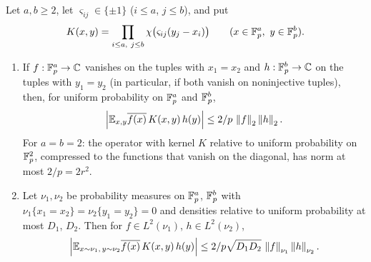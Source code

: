 \begin{corollary}\label{cor:dl:normalized}
Let $a,b\ge2$, let $\varsigma_{ij}\in\{\pm1\}$ ($i\le a$, $j\le b$), and put
\[
  K(x,y)=\prod_{i\le a,\ j\le b}\chi\big(\varsigma_{ij}(y_j-x_i)\big)
  \qquad(x\in\mathbb F_p^a,\ y\in\mathbb F_p^b).
\]
\begin{enumerate}[label=\textup{(\alph*)}]
\item If $f:\mathbb F_p^a\to\mathbb C$ vanishes on the tuples with $x_1=x_2$ and
  $h:\mathbb F_p^b\to\mathbb C$ on the tuples with $y_1=y_2$ (in particular, if both vanish on
  noninjective tuples), then, for uniform probability on $\mathbb F_p^a$ and $\mathbb F_p^b$,
  \begin{equation}\label{eq:dl:normalized}
    \Big|\mathbb E_{x,y}\overline{f(x)}\,K(x,y)\,h(y)\Big|\le2/p\,\left\|f\right\|_2\left\|h\right\|_2 .
  \end{equation}
  For $a=b=2$: the operator with kernel $K$ relative to uniform probability on
  $\mathbb F_p^2$, compressed to the functions that vanish on the diagonal, has norm
  at most $2/p=2r^2$.
\item Let $\nu_1,\nu_2$ be probability measures on $\mathbb F_p^a$, $\mathbb F_p^b$ with
  $\nu_1\{x_1=x_2\}=\nu_2\{y_1=y_2\}=0$ and densities relative to uniform
  probability at most $D_1$, $D_2$. Then for $f\in L^2(\nu_1)$, $h\in L^2(\nu_2)$,
  \[
    \Big|\mathbb E_{x\sim\nu_1,\,y\sim\nu_2}\overline{f(x)}\,K(x,y)\,h(y)\Big|
    \le2/p\sqrt{D_1D_2}\,\left\|f\right\|_{\nu_1}\left\|h\right\|_{\nu_2}.
  \]
\end{enumerate}
\end{corollary}

